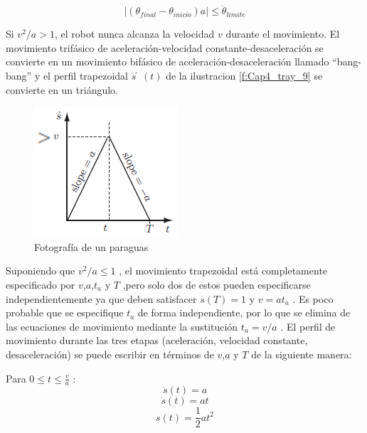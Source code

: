         \begin{equation}
             \left| ({\theta}_{final}-{\theta}_{inicio})a \right|   \leq {\ddot{\theta}}_{limite}
            \label{eq:cap4_tray_29}
        \end{equation}
        
        Si ${v^2}/a > 1$, el robot nunca alcanza la velocidad $v$  durante el movimiento. El movimiento trifásico de aceleración-velocidad constante-desaceleración se convierte en un movimiento bifásico de aceleración-desaceleración llamado “bang-bang” y el perfil trapezoidal $\dot{s}̇(t)$ de la ilustracion \ref{f:Cap4_tray_9} se convierte en un triángulo.
        
        \begin{figure}[htb]
                \centering
                \includegraphics[width=0.27\linewidth]{Main/Chapter4/Images4/cap4_tray_10.png}
                \caption{Fotografía de un paraguas}
                \label{f:Cap4_tray_10}
            \end{figure} 
    
    
            \newpage

        Suponiendo que ${v^2}/a \leq 1$ , el movimiento trapezoidal está completamente especificado por $v$,$a$,$t_a$ y  $T$ ,pero solo dos de estos pueden especificarse independientemente ya que deben satisfacer $s(T)=1$  y $v=at_a$ . Es poco probable que se especifique  $t_a$  de forma independiente, por lo que se elimina de las ecuaciones de movimiento mediante la sustitución ${t}_{a}=v/a$ . El perfil de movimiento durante las tres etapas (aceleración, velocidad constante, desaceleración) se puede escribir en términos de $v$,$a$ y $T$ de la siguiente manera:
        
        Para $0 \leq t \leq \frac{v}{a}$ :
        \begin{equation}
            \ddot{s}(t)=a 
            \label{eq:cap4_tray_30}
        \end{equation}
        \begin{equation}
            \dot{s}(t)=at
            \label{eq:cap4_tray_31}
        \end{equation}
        \begin{equation}
             s(t)=\frac{1}{2}at^2
            \label{eq:cap4_tray_32}
        \end{equation}
        
